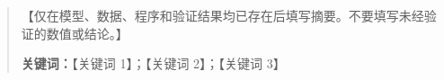 \begin{abstract}
【仅在模型、数据、程序和验证结果均已存在后填写摘要。不要填写未经验证的数值或结论。】

\noindent\textbf{关键词：}【关键词 1】；【关键词 2】；【关键词 3】
\end{abstract}
